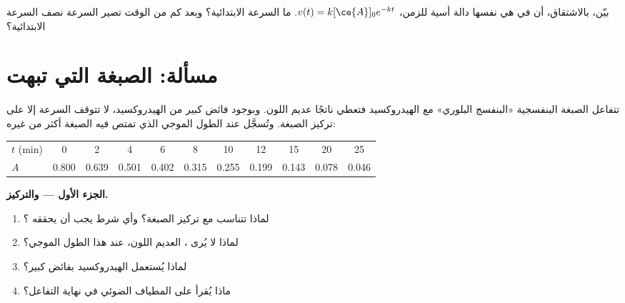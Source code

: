 \begin{exercise}[$\star\star\star$]\label{exo:g12:reaction-rates:15}
بيّن، بالاشتقاق، أن   في  هي نفسها دالة أسية للزمن،
$v(t) = k[\ce{A}]_0 e^{-kt}$. ما السرعة الابتدائية؟ وبعد كم من الوقت تصير
السرعة نصف السرعة الابتدائية؟
\end{exercise}

\section{مسألة: الصبغة التي تبهت}

\begin{problem}
\label{pb:g12:reaction-rates:1}
تتفاعل الصبغة البنفسجية «البنفسج البلوري» مع  الهيدروكسيد فتعطي
ناتجًا عديم اللون. وبوجود فائض كبير من الهيدروكسيد، لا تتوقف السرعة
إلا على تركيز الصبغة. وتُسجَّل  
عند الطول الموجي الذي تمتص فيه الصبغة أكثر من غيره:
\begin{center}
\small
\begin{tabular}{l*{10}{c}}
\hline
$t$ (\si{min}) & 0 & 2 & 4 & 6 & 8 & 10 & 12 & 15 & 20 & 25 \\
$A$ & 0.800 & 0.639 & 0.501 & 0.402 & 0.315 & 0.255 & 0.199 & 0.143 &
0.078 & 0.046 \\
\hline
\end{tabular}
\end{center}

\medskip
\noindent\textbf{الجزء الأول ---  والتركيز.}
\begin{enumerate}
  \item لماذا تتناسب  مع تركيز
        الصبغة؟ وأي شرط يجب أن يحققه ؟
  \item لماذا لا يُرى ، العديم اللون، عند هذا الطول الموجي؟
  \item لماذا يُستعمل الهيدروكسيد بفائض كبير؟
  \item ماذا يُقرأ على المطياف الضوئي في نهاية
        التفاعل؟
\end{enumerate}


\end{problem}

